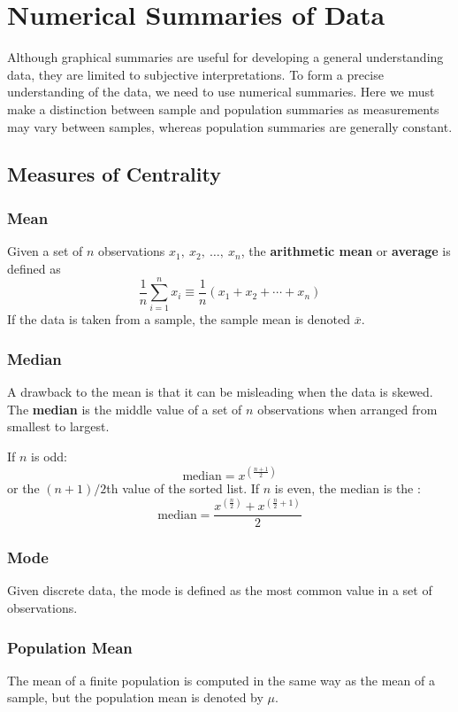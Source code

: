 \documentclass{article}
\begin{document}
\section{Numerical Summaries of Data}
Although graphical summaries are useful for developing a general understanding data,
they are limited to subjective interpretations. To form a precise understanding of the data, we need to use numerical summaries.
Here we must make a distinction between sample and population summaries as measurements may vary
between samples, whereas population summaries are generally constant.
\subsection{Measures of Centrality}
\subsubsection{Mean}
Given a set of \(n\) observations \(x_1,\: x_2,\: \ldots,\: x_n\), the \textbf{arithmetic mean}
or \textbf{average} is defined as
\begin{equation*}
    \frac{1}{n} \sum_{i = 1}^n x_i \equiv \frac{1}{n} \left( x_1 + x_2 + \cdots + x_n \right)
\end{equation*}
If the data is taken from a sample, the sample mean is denoted \(\overline{x}\).
\subsubsection{Median}
A drawback to the mean is that it can be misleading when the data is skewed.
The \textbf{median} is the middle value of a set of \(n\) observations when arranged
from smallest to largest.

If \(n\) is odd:
\begin{equation*}
    \text{median} = x^{\left( \frac{n + 1}{2} \right)}
\end{equation*}
or the \(\left( n + 1 \right) / 2\)th value of the sorted list.
If \(n\) is even, the median is the :
\begin{equation*}
    \text{median} = \frac{x^{\left( \frac{n}{2} \right)} + x^{\left( \frac{n}{2} + 1 \right)}}{2}
\end{equation*}
\subsubsection{Mode}
Given discrete data, the mode is defined as the most common value in a set of observations.
\subsubsection{Population Mean}
The mean of a finite population is computed in the same way as the mean of a sample,
but the population mean is denoted by \(\mu\).
\end{document}
